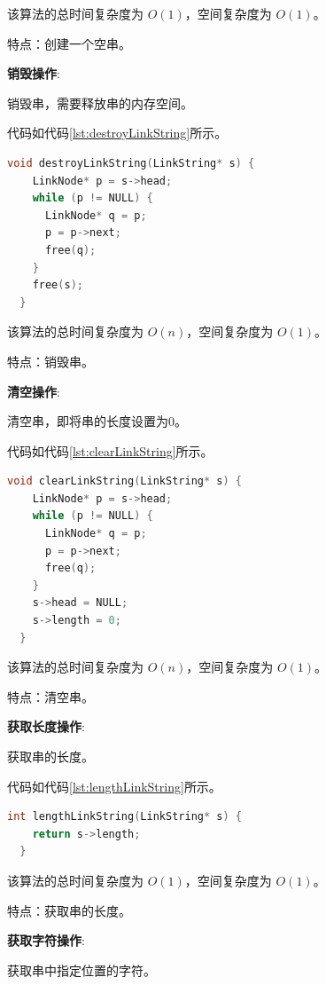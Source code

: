 \documentclass[lang=cn,newtx,10pt,scheme=chinese]{elegantbook}
\begin{document}
该算法的总时间复杂度为 $O(1)$，空间复杂度为 $O(1)$。

特点：创建一个空串。

\textbf{销毁操作}:

销毁串，需要释放串的内存空间。

代码如代码\ref{lst:destroyLinkString}所示。

\begin{lstlisting}[language=C++, caption={销毁串示例代码}, label={lst:destroyLinkString}]
  void destroyLinkString(LinkString* s) {
    LinkNode* p = s->head;
    while (p != NULL) {
      LinkNode* q = p;
      p = p->next;
      free(q);
    }
    free(s);
  }

\end{lstlisting}

该算法的总时间复杂度为 $O(n)$，空间复杂度为 $O(1)$。

特点：销毁串。

\textbf{清空操作}:

清空串，即将串的长度设置为0。

代码如代码\ref{lst:clearLinkString}所示。

\begin{lstlisting}[language=C++, caption={清空串示例代码}, label={lst:clearLinkString}]
  void clearLinkString(LinkString* s) {
    LinkNode* p = s->head;
    while (p != NULL) {
      LinkNode* q = p;
      p = p->next;
      free(q);
    }
    s->head = NULL;
    s->length = 0;
  }

\end{lstlisting}

该算法的总时间复杂度为 $O(n)$，空间复杂度为 $O(1)$。

特点：清空串。

\textbf{获取长度操作}:

获取串的长度。

代码如代码\ref{lst:lengthLinkString}所示。

\begin{lstlisting}[language=C++, caption={获取串的长度示例代码}, label={lst:lengthLinkString}]
  int lengthLinkString(LinkString* s) {
    return s->length;
  }

\end{lstlisting}

该算法的总时间复杂度为 $O(1)$，空间复杂度为 $O(1)$。

特点：获取串的长度。

\textbf{获取字符操作}:

获取串中指定位置的字符。
\end{document}
